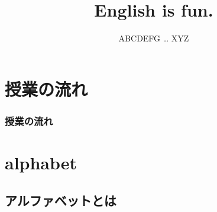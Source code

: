 \documentclass[aspectratio=169,xcolor={dvipsnames,table}]{beamer}
\title{English is fun.}
\subtitle{ABCDEFG \ldots\,\,XYZ}
\author{}
\institute[]{}
\date[]
\begin{document}
%
%
%
%
%
%
%
%
%
%
%

\begin{frame}[label=title]
\label{section-1}
\thispagestyle{empty}
\titlepage
\end{frame}


\section*{授業の流れ}
\begin{frame}[plain]
  \frametitle{授業の流れ}
  \tableofcontents
\end{frame}

\section{alphabet}
\subsection{アルファベットとは}
\end{document}
